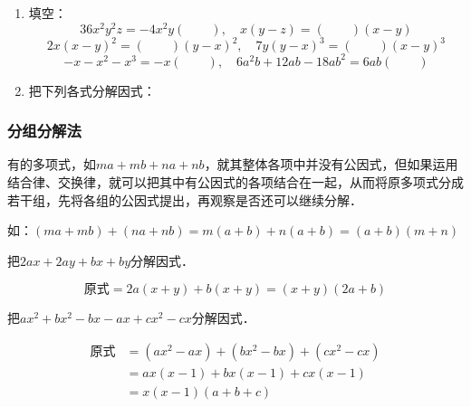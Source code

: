 \begin{ex}
\begin{enumerate}
    \item 填空：
\[36x^2y^2z=-4x^2y(\quad\quad),\quad x(y-z)=(\quad\quad)(x-y)  \]
\[2x(x-y)^2=(\quad\quad)(y-x)^2,\quad 7y(y-x)^3=(\quad\quad)(x-y)^3\]
\[-x-x^2-x^3=-x(\quad\quad),\quad 6a^2b+12ab-18ab^2=6ab(\quad\quad)\]

\item 把下列各式分解因式：
\begin{enumerate}
\end{enumerate}
\end{enumerate}
\end{ex}

\subsubsection{分组分解法}
有的多项式，如$ma+mb+na+nb$，就其整体各项中并没有公因式，但如果运用结合律、交换律，就可以把其中有公因式的各项结合在一起，从而将原多项式分成若干组，先将各组的公因式提出，再观察是否还可以继续分解．

如：$(ma+mb)+(na+nb)=m(a+b)+n(a+b)=(a+b)(m+n)$

\begin{example}
    把$2ax+2ay+bx+by$分解因式．
\end{example}

\begin{solution}
    \[\text{原式}=2a(x+y)+b(x+y)
    = (x+y) (2a+b)\]
\end{solution}

\begin{example}
    把$ax^2+bx^2-bx-ax+cx^2-cx$分解因式．
\end{example}

\begin{solution}
\[\begin{split}
    \text{原式}&=(ax^2-ax)+(bx^2-bx)+(cx^2-cx)\\
&=ax (x-1) +bx (x-1) +cx (x-1)\\
&=x (x-1) (a+b+c)
\end{split}\]    
\end{solution}

